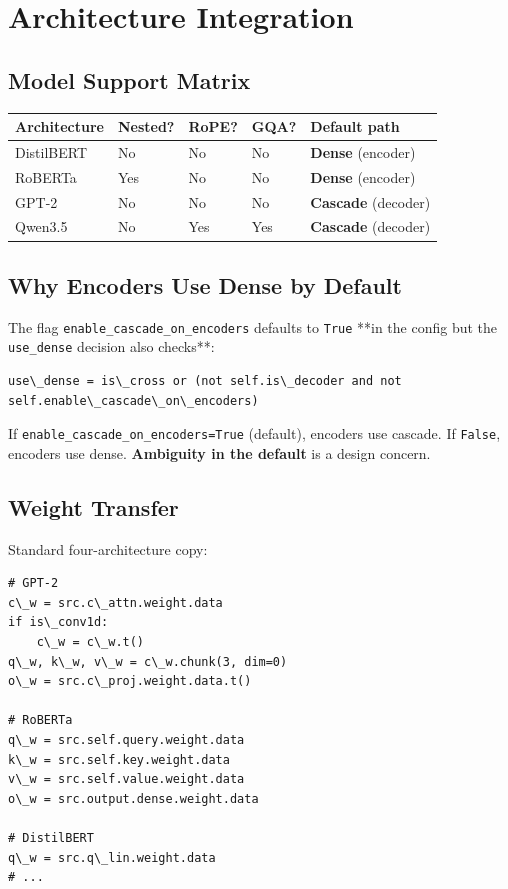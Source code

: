 
\section{Architecture Integration}

\subsection{Model Support Matrix}

\begin{table}[H]
\centering
\small
\begin{tabular}{lllll}
\toprule
\textbf{Architecture} & \textbf{Nested?} & \textbf{RoPE?} & \textbf{GQA?} & \textbf{Default path} \\
\midrule
DistilBERT & No & No & No & \textbf{Dense} (encoder) \\
RoBERTa & Yes & No & No & \textbf{Dense} (encoder) \\
GPT-2 & No & No & No & \textbf{Cascade} (decoder) \\
Qwen3.5 & No & Yes & Yes & \textbf{Cascade} (decoder) \\
\bottomrule
\end{tabular}
\end{table}

\subsection{Why Encoders Use Dense by Default}

The flag \texttt{enable\_cascade\_on\_encoders} defaults to \texttt{True} **in the config 
but the \texttt{use\_dense} decision also checks**:

\begin{lstlisting}
use\_dense = is\_cross or (not self.is\_decoder and not self.enable\_cascade\_on\_encoders)
\end{lstlisting}

If \texttt{enable\_cascade\_on\_encoders=True} (default), encoders use cascade. If 
\texttt{False}, encoders use dense. \textbf{Ambiguity in the default} is a design 
concern.

\subsection{Weight Transfer}

Standard four-architecture copy:

\begin{lstlisting}
# GPT-2
c\_w = src.c\_attn.weight.data
if is\_conv1d:
    c\_w = c\_w.t()
q\_w, k\_w, v\_w = c\_w.chunk(3, dim=0)
o\_w = src.c\_proj.weight.data.t()

# RoBERTa
q\_w = src.self.query.weight.data
k\_w = src.self.key.weight.data
v\_w = src.self.value.weight.data
o\_w = src.output.dense.weight.data

# DistilBERT
q\_w = src.q\_lin.weight.data
# ...
\end{lstlisting}

